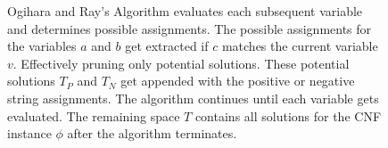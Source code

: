 \begin{figure}[htbp]
\begin{center}
\caption{{\sc Ogihara and Ray's Algorithm} evaluates each subsequent variable and determines possible assignments.  The possible assignments for the variables $a$ and $b$ get extracted if $c$ matches the current variable $v$.  Effectively pruning only potential solutions.  These potential solutions $T_P$ and $T_N$ get appended with the positive or negative string assignments.  The algorithm continues until each variable gets evaluated.  The remaining space $T$ contains all solutions for the CNF instance $\phi$ after the algorithm terminates.}
\label{ogiharaRayAlgorithm}
\end{center}
\end{figure}
